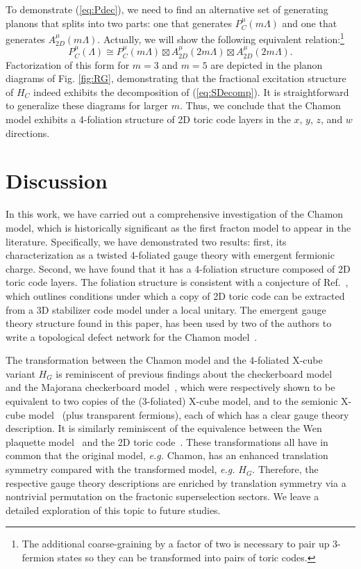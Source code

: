 \documentclass[prx,twocolumn,superscriptaddress,nofootinbib,showpacs,notitlepage]{revtex4-2}
\newcommand{\Chamon}{Chamon }
\begin{document}
To demonstrate (\ref{eq:Pdec}), we need to find an alternative set of generating planons that splits into two parts: one that generates $P_C^\mu(m\Lambda)$ and one that generates $A_{2D}^\mu(m\Lambda)$. Actually, we will show the following equivalent relation:\footnote{The additional coarse-graining by a factor of two is necessary to pair up 3-fermion states so they can be transformed into pairs of toric codes.}
\begin{equation}
    P_C^\mu(\Lambda)\cong P_C^\mu(m\Lambda)\boxtimes A_{2D}^\mu(2m\Lambda)\boxtimes A_{2D}^\mu(2m\Lambda).
    \label{eq:decomp}
\end{equation}
Factorization of this form for $m=3$ and $m=5$ are depicted in the planon diagrams of Fig. \ref{fig:RG}, demonstrating that the fractional excitation structure of $H_C$ indeed exhibits the decomposition of (\ref{eq:SDecomp}). It is straightforward to generalize these diagrams for larger $m$. Thus, we conclude that the \Chamon model exhibits a 4-foliation structure of 2D toric code layers in the $x$, $y$, $z$, and $w$ directions.

\section{Discussion}
\label{sec:Discussion}
In this work, we have carried out a comprehensive investigation of the Chamon model, which is historically significant as the first fracton model to appear in the literature. Specifically, we have demonstrated two results: first, its characterization as a twisted 4-foliated gauge theory with emergent fermionic charge. Second, we have found that it has a 4-foliation structure composed of 2D toric code layers. The foliation structure is consistent with a conjecture of Ref.~\cite{Dua_RG_2019}, which outlines conditions under which a copy of 2D toric code can be extracted from a 3D stabilizer code model under a local unitary. The emergent gauge theory structure found in this paper, has been used by two of the authors to write a topological defect network for the \Chamon model~\cite{song2021topological}.

The transformation between the Chamon model and the 4-foliated X-cube variant $H_G$ is reminiscent of previous findings about the checkerboard model~\cite{shirley2018CB} and the Majorana checkerboard model~\cite{vijay_CB_2015}, which were respectively shown to be equivalent to two copies of the (3-foliated) X-cube model, and to the semionic X-cube model~\cite{Wang2019} (plus transparent fermions), each of which has a clear gauge theory description. It is similarly reminiscent of the equivalence between the Wen plaquette model~\cite{Wen2003} and the 2D toric code~\cite{kitaev2006anyons}. These transformations all have in common that the original model, \textit{e.g.} Chamon, has an enhanced translation symmetry compared with the transformed model, \textit{e.g.} $H_G$. Therefore, the respective gauge theory descriptions are enriched by translation symmetry via a nontrivial permutation on the fractonic superselection sectors. We leave a detailed exploration of this topic to future studies.
\end{document}
